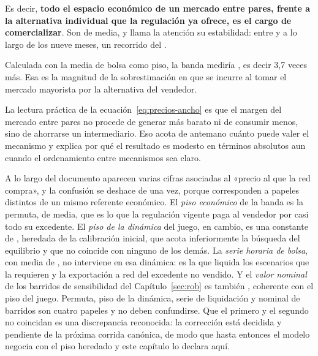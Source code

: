 Es decir, \textbf{todo el espacio económico de un mercado entre pares,
frente a la alternativa individual que la regulación ya ofrece, es el cargo
de comercializar}. Son  de media, y llama la atención
su estabilidad: entre  y  a lo largo de los
nueve meses, un recorrido del .

Calculada con la media de bolsa como piso, la banda mediría
, es decir 3,7 veces más. Esa es la magnitud de la
sobrestimación en que se incurre al tomar el mercado mayorista por la
alternativa del vendedor.

\begin{lecturabox}
La lectura práctica de la ecuación~\ref{eq:precios-ancho} es que el margen
del mercado entre pares no procede de generar más barato ni de consumir
menos, sino de ahorrarse un intermediario. Eso acota de antemano cuánto
puede valer el mecanismo y explica por qué el resultado es modesto en
términos absolutos aun cuando el ordenamiento entre mecanismos sea claro.
\end{lecturabox}

\begin{trampabox}
A lo largo del documento aparecen varias cifras asociadas al «precio al
que la red compra», y la confusión se deshace de una vez, porque
corresponden a papeles distintos de un mismo referente económico. El
\emph{piso económico} de la banda es la permuta,  de
media, que es lo que la regulación vigente paga al vendedor por casi todo
su excedente. El \emph{piso de la dinámica} del juego, en cambio, es una
constante de , heredada de la calibración inicial, que
acota inferiormente la búsqueda del equilibrio y que no coincide con
ninguno de los demás. La \emph{serie horaria de
bolsa}, con media de , no interviene en esa dinámica:
es la que liquida los escenarios que la requieren y la exportación a red
del excedente no vendido. Y el \emph{valor nominal} de los barridos de
sensibilidad del Capítulo~\ref{sec:rob} es también , coherente
con el piso del juego. Permuta, piso de la dinámica, serie de liquidación y
nominal de barridos son cuatro papeles y no deben confundirse. Que el
primero y el segundo no coincidan es una discrepancia reconocida: la
corrección está decidida y pendiente de la próxima corrida canónica, de
modo que hasta entonces el modelo negocia con el piso heredado y este
capítulo lo declara aquí.
\end{trampabox}

